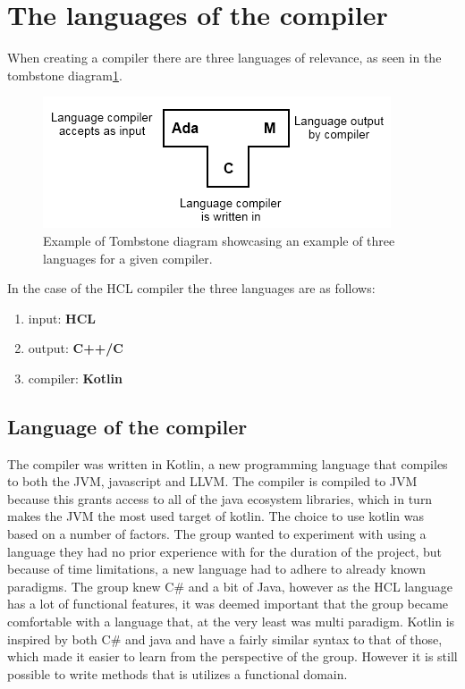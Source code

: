 \section{The languages of the compiler}
When creating a compiler there are three languages of relevance, as seen in the tombstone diagram\ref{fig:TStoneExample}.

\begin{figure}[H]
	\centering
	\includegraphics[width=\textwidth/2+\textwidth/4]{4.Solution/images/T-diagram.png}
	\caption{
		Example of Tombstone diagram showcasing an example of three languages for a given compiler\cite{TStoneWiki}.
	}
	\label{fig:TStoneExample}
\end{figure}
In the case of the HCL compiler the three languages are as follows:

\begin{enumerate}
\item input: \textbf{HCL} \\
\item output: \textbf{C++/C} \\
\item compiler: \textbf{Kotlin} \\
\end{enumerate}

\subsection{Language of the compiler}
The compiler was written in Kotlin\cite{KotlinWebsite}, a new programming language that compiles to both the JVM, javascript and LLVM. 
The compiler is compiled to JVM because this grants access to all of the java ecosystem libraries, which in turn makes the JVM the most used target of kotlin.
The choice to use kotlin was based on a number of factors.
The group wanted to experiment with using a language they had no prior experience with for the duration of the project, but because of time limitations, a new language had to adhere to already known paradigms.
The group knew C\# and a bit of Java, however as the HCL language has a lot of functional features, it was deemed important that the group became comfortable with a language that, at the very least was multi paradigm.
Kotlin is inspired by both C\# and java and have a fairly similar syntax to that of those, which made it easier to learn from the perspective of the group.
However it is still possible to write methods that is utilizes a functional domain.


